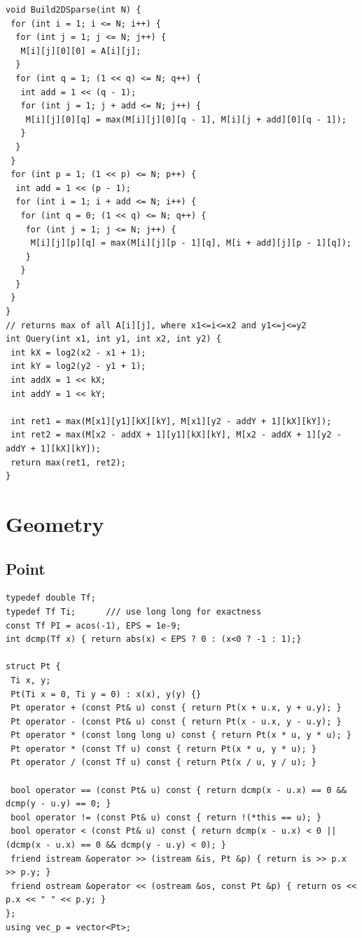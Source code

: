 \documentclass[a4paper,11pt,oneside]{article}
\begin{document}
\begin{multicols*}{\COLS}
\begin{lstlisting}
void Build2DSparse(int N) {
 for (int i = 1; i <= N; i++) {
  for (int j = 1; j <= N; j++) {
   M[i][j][0][0] = A[i][j];
  }
  for (int q = 1; (1 << q) <= N; q++) {
   int add = 1 << (q - 1);
   for (int j = 1; j + add <= N; j++) {
    M[i][j][0][q] = max(M[i][j][0][q - 1], M[i][j + add][0][q - 1]);
   }
  }
 }
 for (int p = 1; (1 << p) <= N; p++) {
  int add = 1 << (p - 1);
  for (int i = 1; i + add <= N; i++) {
   for (int q = 0; (1 << q) <= N; q++) {
    for (int j = 1; j <= N; j++) {
     M[i][j][p][q] = max(M[i][j][p - 1][q], M[i + add][j][p - 1][q]);
    }
   }
  }
 }
}
// returns max of all A[i][j], where x1<=i<=x2 and y1<=j<=y2
int Query(int x1, int y1, int x2, int y2) {
 int kX = log2(x2 - x1 + 1);
 int kY = log2(y2 - y1 + 1);
 int addX = 1 << kX;
 int addY = 1 << kY;

 int ret1 = max(M[x1][y1][kX][kY], M[x1][y2 - addY + 1][kX][kY]);
 int ret2 = max(M[x2 - addX + 1][y1][kX][kY], M[x2 - addX + 1][y2 - addY + 1][kX][kY]);
 return max(ret1, ret2);
}
\end{lstlisting}
\section{Geometry}
\subsection{Point}
\begin{lstlisting}
typedef double Tf;
typedef Tf Ti;      /// use long long for exactness
const Tf PI = acos(-1), EPS = 1e-9;
int dcmp(Tf x) { return abs(x) < EPS ? 0 : (x<0 ? -1 : 1);}

struct Pt {
 Ti x, y;
 Pt(Ti x = 0, Ti y = 0) : x(x), y(y) {}
 Pt operator + (const Pt& u) const { return Pt(x + u.x, y + u.y); }
 Pt operator - (const Pt& u) const { return Pt(x - u.x, y - u.y); }
 Pt operator * (const long long u) const { return Pt(x * u, y * u); }
 Pt operator * (const Tf u) const { return Pt(x * u, y * u); }
 Pt operator / (const Tf u) const { return Pt(x / u, y / u); }

 bool operator == (const Pt& u) const { return dcmp(x - u.x) == 0 && dcmp(y - u.y) == 0; }
 bool operator != (const Pt& u) const { return !(*this == u); }
 bool operator < (const Pt& u) const { return dcmp(x - u.x) < 0 || (dcmp(x - u.x) == 0 && dcmp(y - u.y) < 0); }
 friend istream &operator >> (istream &is, Pt &p) { return is >> p.x >> p.y; }
 friend ostream &operator << (ostream &os, const Pt &p) { return os << p.x << " " << p.y; }
};
using vec_p = vector<Pt>;


\end{lstlisting}
\end{multicols*}
\end{document}
